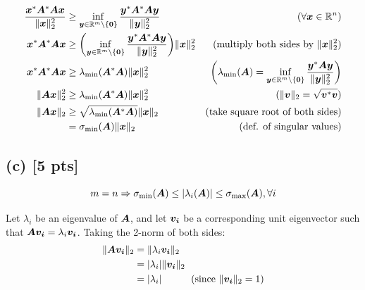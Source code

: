\documentclass[twoside,10pt]{article}
\begin{document}
\begin{align*}
  \dfrac{\vct{x}^{*}\mtx{A}^{*}\mtx{A}\vct{x}}{\|\vct{x}\|_2^2} &\geq\inf \limits_{\vct{y} \in \R^m \setminus \{\vct{0}\}} \dfrac{\vct{y}^{*} \mtx{A}^{*}\mtx{A}\vct{y}}{\|\vct{y}\|_2^2} &\text{($\forall\vct{x} \in \R^n$)}\\
  \vct{x}^{*}\mtx{A}^{*}\mtx{A}\vct{x} &\geq \left(\inf \limits_{\vct{y} \in \R^m \setminus \{\vct{0}\}} \dfrac{\vct{y}^{*} \mtx{A}^{*}\mtx{A}\vct{y}}{\|\vct{y}\|_2^2}\right) \|\vct{x}\|_2^2  &\text{(multiply both sides by $\|\vct{x}\|_2^2$)}\\
  \vct{x}^{*}\mtx{A}^{*}\mtx{A}\vct{x} &\geq \lambda_{\mathrm{min}}(\mtx{A}^{*}\mtx{A}) \|\vct{x}\|_2^2 &\text{$\left(\lambda_{\mathrm{min}}\left(\mtx{A}\right) = \inf \limits_{\vct{y} \in \R^m \setminus \{\vct{0}\}} \dfrac{\vct{y}^{*} \mtx{A}\vct{y}}{\|\vct{y}\|_2^2}\right)$}\\
  \|\mtx{A}\vct{x}\|_2^2 &\geq \lambda_{\mathrm{min}}(\mtx{A}^{*}\mtx{A}) \|\vct{x}\|_2^2 &\text{($\|\vct{v}\|_2 = \sqrt{\vct{v}^{*}\vct{v}}$)}\\
  \|\mtx{A}\vct{x}\|_2 &\geq \sqrt{\lambda_{\mathrm{min}}(\mtx{A}^{*}\mtx{A})} \|\vct{x}\|_2 &\text{(take square root of both sides)}\\
  &=\sigma_{\mathrm{min}}\left(\mtx{A}\right) \|\vct{x}\|_2 &\text{(def. of singular values)}\\
\end{align*}

\subsection*{(c) [5 pts]}
  \begin{equation*}
    m = n \Rightarrow \sigma_{\mathrm{min}}(\mtx{A}) \leq \left|\lambda_{i}\left(\mtx{A}\right)\right| \leq \sigma_{\mathrm{max}}\left(\mtx{A}\right), \forall i 
  \end{equation*}

  Let $\lambda_i$ be an eigenvalue of $\bm{A}$, and let $\bm{v_i}$ be a corresponding unit eigenvector such that $\bm{A}\bm{v_i} = \lambda_i\bm{v_i}$. 
  Taking the 2-norm of both sides:
  \begin{align*}
    \|\bm{A}\bm{v_i}\|_2 &= \|\lambda_i \bm{v_i}\|_2\\
    &= |\lambda_i| \|\bm{v_i}\|_2\\
    &= |\lambda_i|\quad\quad\quad\text{(since $\|\bm{v_i}\|_2 = 1$)}
  \end{align*}
\end{document}
